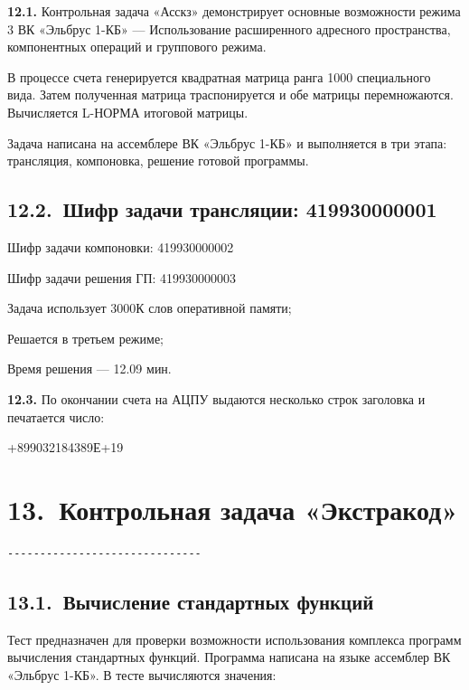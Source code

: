 \documentclass[11pt,a4paper]{article}
\begin{document}
\par\textbf{12.1.} Контрольная задача «Асскз» демонстрирует основные возможности режима 3 ВК «Эльбрус 1-КБ» --- Использование расширенного адресного пространства, компонентных операций и группового режима.\par
В процессе счета генерируется квадратная матрица ранга 1000 специального вида. Затем полученная матрица траспонируется и обе матрицы перемножаются. Вычисляется L-НОРМА итоговой матрицы.

Задача написана на ассемблере ВК «Эльбрус 1-КБ» и выполняется в три этапа: трансляция, компоновка, решение готовой программы.

\subsection*{12.2.~Шифр задачи трансляции: 419930000001}
\begin{center}Шифр задачи компоновки: 419930000002\end{center}
\begin{center}Шифр задачи решения ГП: 419930000003\end{center}
Задача использует 3000К слов оперативной памяти;

Решается в третьем режиме;

Время решения --- 12.09 мин.

\par\textbf{12.3.} По окончании счета на АЦПУ выдаются несколько строк заголовка и печатается число:\par
+899032184389Е+19

\section*{13.~Контрольная задача «Экстракод»}
\begin{center}\small
\begin{BVerbatim}
------------------------------
\end{BVerbatim}
\end{center}

\subsection*{13.1.~Вычисление стандартных функций}
Тест предназначен для проверки возможности использования комплекса программ вычисления стандартных функций. Программа написана на языке ассемблер ВК «Эльбрус 1-КБ». В тесте вычисляются значения:
\end{document}
